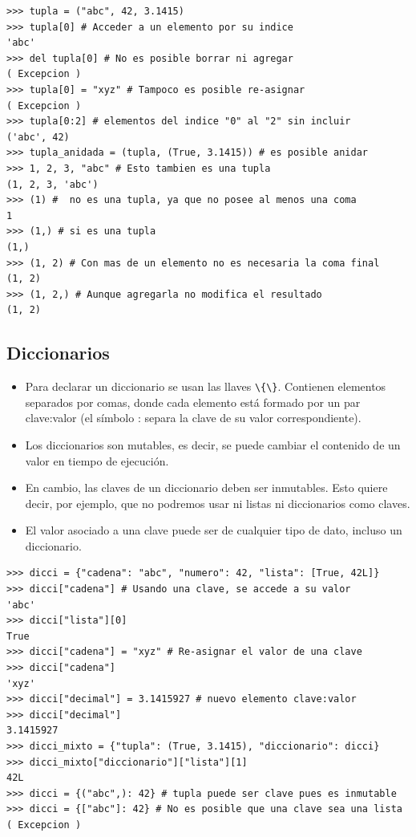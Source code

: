 \begin{lstlisting}
>>> tupla = ("abc", 42, 3.1415)
>>> tupla[0] # Acceder a un elemento por su indice
'abc'
>>> del tupla[0] # No es posible borrar ni agregar
( Excepcion )
>>> tupla[0] = "xyz" # Tampoco es posible re-asignar
( Excepcion )
>>> tupla[0:2] # elementos del indice "0" al "2" sin incluir
('abc', 42)
>>> tupla_anidada = (tupla, (True, 3.1415)) # es posible anidar
>>> 1, 2, 3, "abc" # Esto tambien es una tupla
(1, 2, 3, 'abc')
>>> (1) #  no es una tupla, ya que no posee al menos una coma
1
>>> (1,) # si es una tupla
(1,)
>>> (1, 2) # Con mas de un elemento no es necesaria la coma final
(1, 2)
>>> (1, 2,) # Aunque agregarla no modifica el resultado
(1, 2)
\end{lstlisting}

\subsection{Diccionarios}
\begin{itemize}
\item    Para declarar un diccionario se usan las llaves \verb~\{\}~. Contienen elementos separados por comas, donde cada elemento está formado por un par clave:valor (el símbolo : separa la clave de su valor correspondiente).
 \item   Los diccionarios son mutables, es decir, se puede cambiar el contenido de un valor en tiempo de ejecución.
\item    En cambio, las claves de un diccionario deben ser inmutables. Esto quiere decir, por ejemplo, que no podremos usar ni listas ni diccionarios como claves.
\item    El valor asociado a una clave puede ser de cualquier tipo de dato, incluso un diccionario.

\end{itemize}






\begin{lstlisting}
>>> dicci = {"cadena": "abc", "numero": 42, "lista": [True, 42L]}
>>> dicci["cadena"] # Usando una clave, se accede a su valor
'abc'
>>> dicci["lista"][0]
True
>>> dicci["cadena"] = "xyz" # Re-asignar el valor de una clave
>>> dicci["cadena"]
'xyz'
>>> dicci["decimal"] = 3.1415927 # nuevo elemento clave:valor
>>> dicci["decimal"]
3.1415927
>>> dicci_mixto = {"tupla": (True, 3.1415), "diccionario": dicci}
>>> dicci_mixto["diccionario"]["lista"][1]
42L
>>> dicci = {("abc",): 42} # tupla puede ser clave pues es inmutable
>>> dicci = {["abc"]: 42} # No es posible que una clave sea una lista
( Excepcion )
\end{lstlisting}



